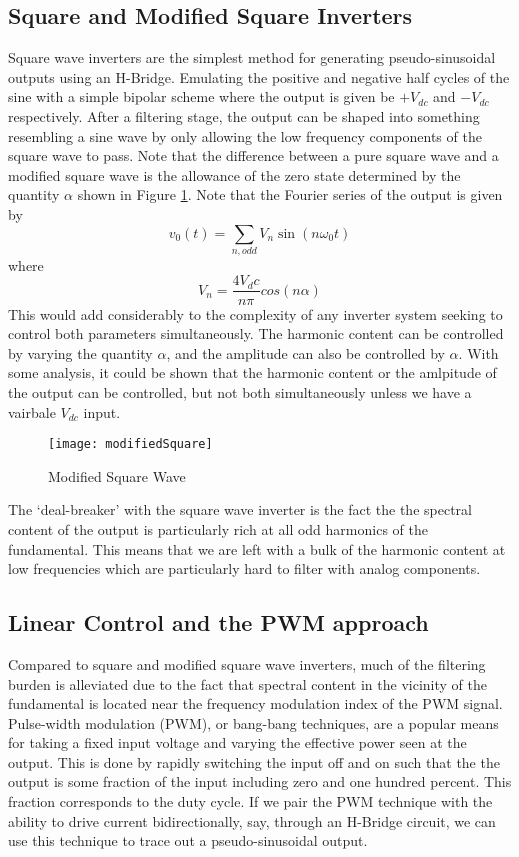 \subsection{Square and Modified Square Inverters}
Square wave inverters are the simplest method for generating pseudo-sinusoidal outputs using an H-Bridge. Emulating the positive and negative half cycles of the sine with a simple bipolar scheme where the output is given be $+V_{dc}$ and $-V_{dc}$ respectively. After a filtering stage, the output can be shaped into something resembling a sine wave by only allowing the low frequency components of the square wave to pass. Note that the difference between a pure square wave and a modified square wave is the allowance of the zero state determined by the quantity $\alpha$ shown in Figure \ref{modifiedSquare}. Note that the Fourier series of the output is given by 
\begin{equation}
v_0(t)=\sum\limits_{n,odd}V_n\sin{(n\omega_0t)}
\end{equation}
where 
\begin{equation}
V_n=\frac{4V_dc}{n\pi}cos{(n\alpha)}
\end{equation}
This would add considerably to the complexity of any inverter system seeking to control both parameters simultaneously. The harmonic content can be controlled by varying the quantity $\alpha$, and the amplitude can also be controlled by $\alpha$. With some analysis, it could be shown that the harmonic content or the amlpitude of the output can be controlled, but not both simultaneously unless we have a vairbale $V_{dc}$ input. 

\begin{figure}[h]
\centering
\texttt{[image: modifiedSquare]}
\caption{Modified Square Wave}
\label{modifiedSquare}
\end{figure}

The `deal-breaker' with the square wave inverter is the fact the the spectral content of the output is particularly rich at all odd harmonics of the fundamental. This means that we are left with a bulk of the harmonic content at low frequencies which are particularly hard to filter with analog components. 

\subsection{Linear Control and the PWM approach}
\label{pwmApproach}
Compared to square and modified square wave inverters, much of the filtering burden is alleviated due to the fact that spectral content in the vicinity of the fundamental is located near the frequency modulation index of the PWM signal. Pulse-width modulation (PWM), or bang-bang techniques, are a popular means for taking a fixed input voltage and varying the effective power seen at the output. This is done by rapidly switching the input off and on such that the the output is some fraction of the input including zero and one hundred percent. This fraction corresponds to the duty cycle. If we pair the PWM technique with the ability to drive current bidirectionally, say, through an H-Bridge circuit, we can use this technique to trace out a pseudo-sinusoidal output. 

